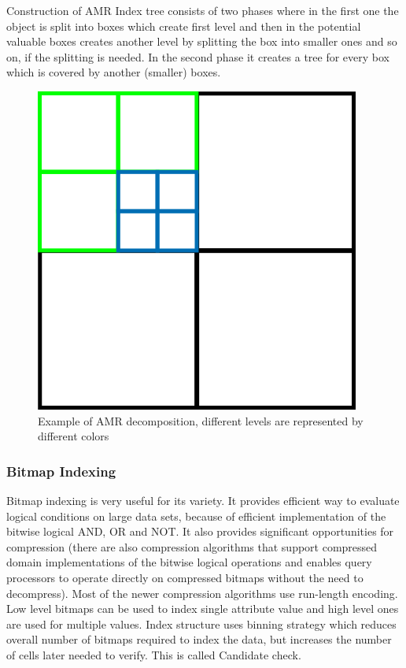 Construction of AMR Index tree consists of two phases where in the first one the object is split into boxes which create first level and then in the potential valuable boxes creates another level by splitting the box into smaller ones and so on, if the splitting is needed. In the second phase it creates a tree for every box which is covered by another (smaller) boxes.

\begin{figure}
\centering
\includegraphics[scale=0.5]{amr_obr.png}
\caption{Example of AMR decomposition, different levels are represented by different colors}
\end{figure}


\subsubsection{Bitmap Indexing}
Bitmap indexing is very useful for its variety. It provides efficient way to evaluate logical conditions on large data sets, because of efficient implementation of the bitwise logical AND, OR and NOT. It also provides significant opportunities for compression (there are also compression algorithms that support compressed domain implementations of the bitwise logical operations and enables query processors to operate directly on compressed bitmaps without the need to decompress). Most of the newer compression algorithms use run-length encoding. Low level bitmaps can be used to index single attribute value and high level ones are used for multiple values. Index structure uses binning strategy which reduces overall number of bitmaps required to index the data, but increases the number of cells later needed to verify. This is called Candidate check. 

